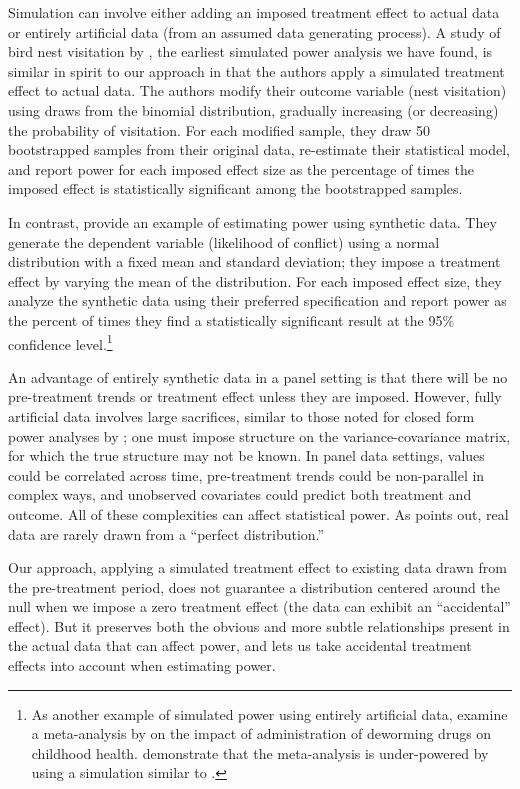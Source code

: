 \documentclass[12pt]{article}%
\begin{document}
Simulation can involve either adding an imposed treatment effect to actual data or entirely artificial data (from an assumed data generating process). 
A study of bird nest visitation by \citet{Hannon1993},  the earliest simulated power analysis we have found, is similar in spirit to our approach in that the authors apply a simulated treatment effect to actual data. 
The authors modify their outcome variable (nest visitation) using draws from the binomial distribution, gradually increasing (or decreasing) the probability of visitation. 
For each modified sample, they draw 50 bootstrapped samples from their original data, re-estimate their statistical model, and report power for each imposed effect size as the percentage of times the imposed effect is statistically significant among the bootstrapped samples. 

In contrast, \citet{Hsiang2009} provide an example of estimating power using synthetic data.  
They generate the dependent variable (likelihood of conflict) using a normal distribution with a fixed mean and standard deviation; they impose a treatment effect by varying the mean of the distribution. 
For each imposed effect size, they analyze the synthetic data using their preferred specification and report power as the percent of times they find a statistically significant result at the 95\% confidence level.\footnote{As another example of simulated power using entirely artificial data,  \citet{Croke2016} examine a meta-analysis by \citet{Taylor-Robinson2015} on the impact of  administration of deworming drugs on childhood health. \citet{Croke2016}  demonstrate that the meta-analysis is under-powered by using a simulation similar to \citet{Hsiang2009}. }


An advantage of entirely synthetic data in a panel setting is that there will be no pre-treatment trends or treatment effect unless they are imposed.  
However, fully artificial data involves large sacrifices, similar to those noted for closed form power analyses by \citet{Burlig2019}; one must impose structure on the variance-covariance matrix, for which the true structure may not be known.  
In panel data settings, values could be correlated across time, pre-treatment trends could be non-parallel in complex ways, and unobserved covariates could predict both treatment and outcome.  
All of these complexities can affect statistical power.  
As \citet{Stigler1977} points out, real data are rarely drawn from a ``perfect distribution.''

Our approach, applying a simulated treatment effect to existing data drawn from the pre-treatment period, does not guarantee a distribution centered around the null when we impose a zero treatment effect (the data can exhibit an ``accidental'' effect).  
But it preserves both the obvious and more subtle relationships present in the actual data that can affect power, and lets us take accidental treatment effects into account when estimating power.  
\end{document}
